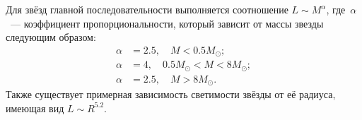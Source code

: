 Для звёзд главной последовательности выполняется соотношение $L \sim M^{\alpha}$, где~$\alpha$~--- коэффициент пропорциональности, который зависит от массы звезды следующим образом:
\begin{align*}
	\alpha &= 2.5,\quad M < 0.5 M_\odot; \\
	\alpha &= 4, \quad 0.5 M_\odot < M < 8 M_\odot;\\
	\alpha &= 2.5, \quad  M > 8 M_\odot.
\end{align*}
Также существует примерная зависимость светимости звёзды от её радиуса, имеющая вид  $L\sim R^{5.2}$.
